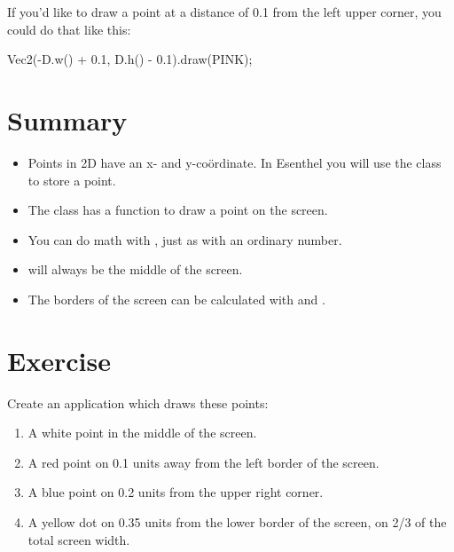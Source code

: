 If you'd like to draw a point at a distance of 0.1 from the left upper corner, you could do that like this:

\begin{code}
Vec2(-D.w() + 0.1, D.h() - 0.1).draw(PINK);
\end{code}

\section{Summary}
\begin{itemize}
\item Points in 2D have an x- and y-co\"ordinate. In Esenthel you will use the class  to store a point.
\item The class  has a function  to draw a point on the screen.
\item You can do math with , just as with an ordinary number.
\item {} will always be the middle of the screen.
\item The borders of the screen can be calculated with  and .
\end{itemize}

\section{Exercise}
Create an application which draws these points:
\begin{enumerate}
	\item A white point in the middle of the screen.
	\item A red point on 0.1 units away from the left border of the screen.
	\item A blue point on 0.2 units from the upper right corner.
	\item A yellow dot on 0.35 units from the lower border of the screen, on 2/3 of the total screen width.
\end{enumerate}

